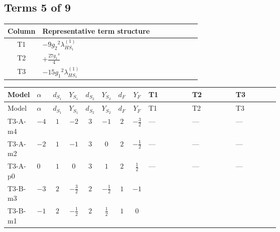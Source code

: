 \documentclass[8pt]{article}
\begin{document}
\begin{landscape}
\subsection*{Terms 5 of 9}
\begin{center}
\begin{tabular}{@{}c >{\raggedright\arraybackslash}p{0.82\linewidth}@{}}
\toprule
Column & Representative term structure \\
\midrule
T1 & \(\displaystyle -9 {g_2}^2 {\lambda_{HS_1}^{(1)}}\) \\
\midrule
T2 & \(\displaystyle +\frac{27 {g_1}^4}{4}\) \\
\midrule
T3 & \(\displaystyle -15 {g_1}^2 {\lambda_{HS_1}^{(1)}}\) \\
\midrule
\bottomrule
\end{tabular}
\end{center}
\smallskip
\tiny
\begin{longtable}{@{}llcccccc >{\raggedright\arraybackslash}p{0.21\linewidth} >{\raggedright\arraybackslash}p{0.21\linewidth} >{\raggedright\arraybackslash}p{0.21\linewidth}@{}}
\toprule
Model & $\alpha$ & $d_{S_1}$ & $Y_{S_1}$ & $d_{S_2}$ & $Y_{S_2}$ & $d_F$ & $Y_F$ & T1 & T2 & T3 \\
\midrule
\endfirsthead
\toprule
Model & $\alpha$ & $d_{S_1}$ & $Y_{S_1}$ & $d_{S_2}$ & $Y_{S_2}$ & $d_F$ & $Y_F$ & T1 & T2 & T3 \\
\midrule
\endhead
T3-A-m4 & $-4$ & $1$ & $-2$ & $3$ & $-1$ & $2$ & $-\frac{3}{2}$ & --- & --- & --- \\
\midrule
T3-A-m2 & $-2$ & $1$ & $-1$ & $3$ & $0$ & $2$ & $-\frac{1}{2}$ & --- & --- & --- \\
\midrule
T3-A-p0 & $0$ & $1$ & $0$ & $3$ & $1$ & $2$ & $\frac{1}{2}$ & --- & --- & --- \\
\midrule
T3-B-m3 & $-3$ & $2$ & $-\frac{3}{2}$ & $2$ & $-\frac{1}{2}$ & $1$ & $-1$ & \scriptsize\adjustbox{max width=\linewidth}{$\begin{gathered} -9 {g_2}^2 {\lambda_{HS_1}^{(1)}}\end{gathered}$} & \scriptsize\adjustbox{max width=\linewidth}{$\begin{gathered} +\frac{27 {g_1}^4}{4}\end{gathered}$} & \scriptsize\adjustbox{max width=\linewidth}{$\begin{gathered} -15 {g_1}^2 {\lambda_{HS_1}^{(1)}}\end{gathered}$} \\
\midrule
T3-B-m1 & $-1$ & $2$ & $-\frac{1}{2}$ & $2$ & $\frac{1}{2}$ & $1$ & $0$ & \scriptsize\adjustbox{max width=\linewidth}{$\begin{gathered} -9 {g_2}^2 {\lambda_{HS_1}^{(1)}}\end{gathered}$} & \scriptsize\adjustbox{max width=\linewidth}{$\begin{gathered} +\frac{3 {g_1}^4}{4}\end{gathered}$} & \scriptsize\adjustbox{max width=\linewidth}{$\begin{gathered} -3 {g_1}^2 {\lambda_{HS_1}^{(1)}}\end{gathered}$} \\

\end{longtable}
\end{landscape}
\end{document}
